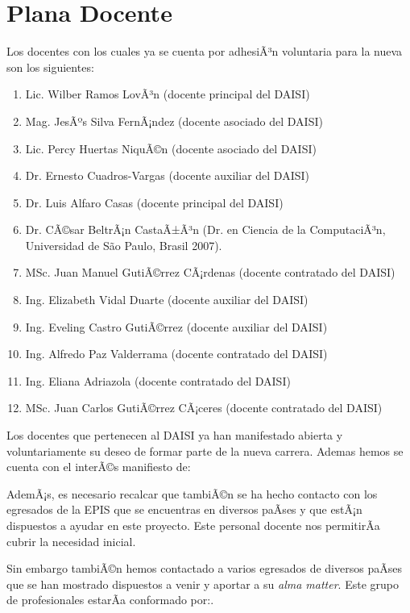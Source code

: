 \section{Plana Docente}\label{sec:staff}
Los docentes con los cuales ya se cuenta por adhesiÃ³n voluntaria para la nueva \SchoolFullName son los siguientes:

\begin{enumerate}
\item Lic. Wilber Ramos LovÃ³n (docente principal del DAISI)
\item Mag. JesÃºs Silva FernÃ¡ndez (docente asociado del DAISI)
\item Lic. Percy Huertas NiquÃ©n (docente asociado del DAISI)
\item Dr.  Ernesto Cuadros-Vargas (docente auxiliar del DAISI)
\item Dr.  Luis Alfaro Casas (docente principal del DAISI)
\item Dr. CÃ©sar BeltrÃ¡n CastaÃ±Ã³n (Dr. en Ciencia de la ComputaciÃ³n, Universidad de S\~ao Paulo, Brasil 2007).
\item MSc. Juan Manuel GutiÃ©rrez CÃ¡rdenas (docente contratado del DAISI)
\item Ing. Elizabeth Vidal Duarte (docente auxiliar del DAISI)
\item Ing. Eveling Castro GutiÃ©rrez (docente auxiliar del DAISI)
\item Ing. Alfredo Paz Valderrama (docente contratado del DAISI)
\item Ing. Eliana Adriazola (docente contratado del DAISI)
\item MSc. Juan Carlos GutiÃ©rrez CÃ¡ceres (docente contratado del DAISI)
\end{enumerate}

Los docentes que pertenecen al DAISI ya han manifestado abierta y voluntariamente su deseo de formar parte de la nueva carrera. Ademas hemos se cuenta con el interÃ©s manifiesto de:

\begin{enumerate}
\end{enumerate}

AdemÃ¡s, es necesario recalcar que tambiÃ©n se ha hecho contacto con los egresados de la EPIS que se encuentras en diversos paÃ­ses y que estÃ¡n dispuestos a ayudar en este proyecto. Este personal docente nos permitirÃ­a cubrir la necesidad inicial.

Sin embargo tambiÃ©n hemos contactado a varios egresados de diversos paÃ­ses que se han mostrado dispuestos a venir y aportar a su \textit{alma matter}. Este grupo de profesionales estarÃ­a conformado por:.

